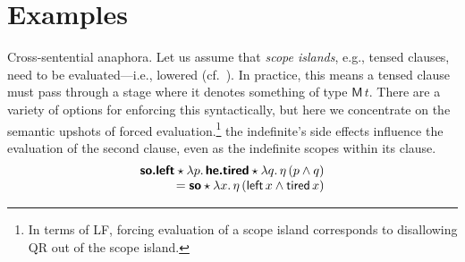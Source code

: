 \section{Examples}
	Cross-sentential anaphora. Let us assume that \emph{scope islands}, e.g., tensed clauses, need to be evaluated---i.e., lowered (cf.~\citealt{Barker:2002, BarkerShan:2008}). In practice, this means a tensed clause must pass through a stage where it denotes something of type $\textsf{M}\,t$. There are a variety of options for enforcing this syntactically, but here we concentrate on the semantic upshots of forced evaluation.\footnote{In terms of LF, forcing evaluation of a scope island corresponds to disallowing QR out of the scope island.} the indefinite's side effects influence the evaluation of the second clause, even as the indefinite scopes within its clause. %
	\[\begin{array}{r}
		\bsf{so.left} \star \lambda p.\,\bsf{he.tired} \star \lambda q.\,\eta\,(p \wedge q)%
		\\
		= \bsf{so} \star \lambda x.\,\eta\,(\textsf{left}\,x \wedge \textsf{tired}\,x)%
	\end{array}\]
